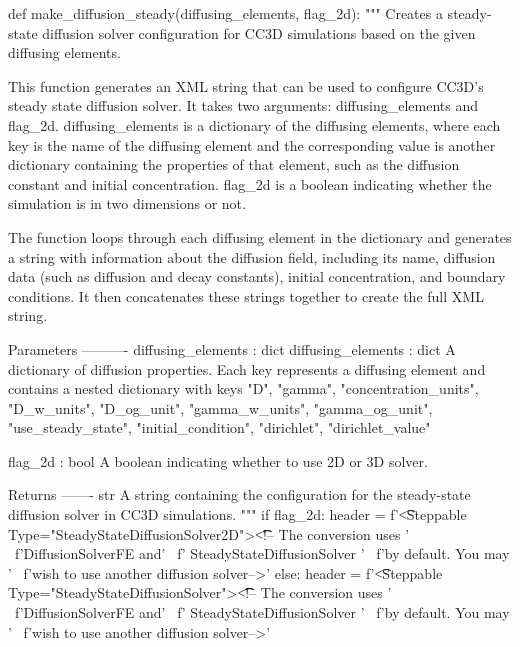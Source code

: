 \begin{python}
def make_diffusion_steady(diffusing_elements, flag_2d):
    """
    Creates a steady-state diffusion solver configuration for CC3D simulations based on the given diffusing elements.

    This function generates an XML string that can be used to configure CC3D's steady state diffusion solver. It takes
    two arguments: diffusing_elements and flag_2d. diffusing_elements is a dictionary of the diffusing
    elements, where each key is the name of the diffusing element and the corresponding value is another dictionary
    containing the properties of that element, such as the diffusion constant and initial concentration. flag_2d is a
    boolean indicating whether the simulation is in two dimensions or not.

    The function loops through each diffusing element in the dictionary and generates a string with information about
    the diffusion field, including its name, diffusion data (such as diffusion and decay constants), initial
    concentration, and boundary conditions. It then concatenates these strings together to create the full XML string.

    Parameters
    ----------
    diffusing_elements : dict
        diffusing_elements : dict
        A dictionary of diffusion properties. Each key represents a diffusing element and contains a nested dictionary
        with keys "D", "gamma", "concentration_units", "D_w_units", "D_og_unit", "gamma_w_units", "gamma_og_unit",
        "use_steady_state", "initial_condition", "dirichlet", "dirichlet_value"

    flag_2d : bool
        A boolean indicating whether to use 2D or 3D solver.

    Returns
    -------
    str
        A string containing the configuration for the steady-state diffusion solver in CC3D simulations.
    """
    if flag_2d:
        header = f'\n\n\t<Steppable Type="SteadyStateDiffusionSolver2D">\n\t\t<!-- The conversion uses ' \
                 f'DiffusionSolverFE and' \
                 f' SteadyStateDiffusionSolver ' \
                 f'by default. You may ' \
                 f'wish to use another diffusion solver-->\n'
    else:
        header = f'\n\n\t<Steppable Type="SteadyStateDiffusionSolver">\n\t\t<!-- The conversion uses ' \
                 f'DiffusionSolverFE and' \
                 f' SteadyStateDiffusionSolver ' \
                 f'by default. You may ' \
                 f'wish to use another diffusion solver-->\n'


\end{python}
